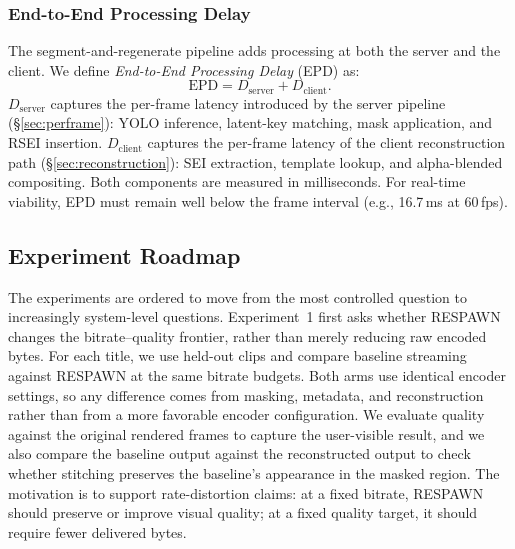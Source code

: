 \subsubsection{End-to-End Processing Delay}
\label{sec:metricDelay}

The segment-and-regenerate pipeline adds processing at both the server and the client.
We define \emph{End-to-End Processing Delay} (EPD) as:
\[
  \mathrm{EPD} = D_{\mathrm{server}} + D_{\mathrm{client}}.
\]
$D_{\mathrm{server}}$ captures the per-frame latency introduced by the server pipeline (\S\ref{sec:perframe}): YOLO inference, latent-key matching, mask application, and RSEI insertion.
$D_{\mathrm{client}}$ captures the per-frame latency of the client reconstruction path (\S\ref{sec:reconstruction}): SEI extraction, template lookup, and alpha-blended compositing.
Both components are measured in milliseconds.
For real-time viability, EPD must remain well below the frame interval (e.g., 16.7\,ms at 60\,fps).

\subsection{Experiment Roadmap}
\label{sec:evaluationRoadmap}

The experiments are ordered to move from the most controlled question to increasingly system-level questions.
Experiment~1 first asks whether RESPAWN changes the bitrate--quality frontier, rather than merely reducing raw encoded bytes.
For each title, we use held-out clips and compare baseline streaming against RESPAWN at the same bitrate budgets.
Both arms use identical encoder settings, so any difference comes from masking, metadata, and reconstruction rather than from a more favorable encoder configuration.
We evaluate quality against the original rendered frames to capture the user-visible result, and we also compare the baseline output against the reconstructed output to check whether stitching preserves the baseline's appearance in the masked region.
The motivation is to support rate-distortion claims: at a fixed bitrate, RESPAWN should preserve or improve visual quality; at a fixed quality target, it should require fewer delivered bytes.

